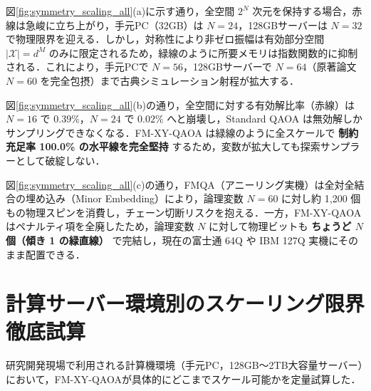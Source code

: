\documentclass[11pt,a4paper]{ltjsarticle}
\begin{document}
\begin{tcolorbox}[keybox, title=機構 1：古典シミュレータのメモリ爆発回避（図(a)参照）]
図\ref{fig:symmetry_scaling_all}(a)に示す通り，全空間 $2^N$ 次元を保持する場合，赤線は急峻に立ち上がり，手元PC（32GB）は $N=24$，128GBサーバーは $N=32$ で物理限界を迎える．しかし，対称性により非ゼロ振幅は有効部分空間 $|\mathcal{X}| = d^M$ のみに限定されるため，緑線のように所要メモリは指数関数的に抑制される．これにより，手元PCで $N=56$，128GBサーバーで $N=64$（原著論文 $N=60$ を完全包摂）まで古典シミュレーション射程が拡大する．
\end{tcolorbox}

\begin{tcolorbox}[keybox, title=機構 2：アルゴリズム的死滅の根本打破（図(b)参照）]
図\ref{fig:symmetry_scaling_all}(b)の通り，全空間に対する有効解比率（赤線）は $N=16$ で $0.39\%$，$N=24$ で $0.02\%$ へと崩壊し，Standard QAOA は無効解しかサンプリングできなくなる．FM-XY-QAOA は緑線のように全スケールで \textbf{制約充足率 100.0\% の水平線を完全堅持} するため，変数が拡大しても探索サンプラーとして破綻しない．
\end{tcolorbox}

\begin{tcolorbox}[keybox, title=機構 3：実機物理ビットの 1対1 対応と浅い回路（図(c)参照）]
図\ref{fig:symmetry_scaling_all}(c)の通り，FMQA（アニーリング実機）は全対全結合の埋め込み（Minor Embedding）により，論理変数 $N=60$ に対し約 1,200 個もの物理スピンを消費し，チェーン切断リスクを抱える．一方，FM-XY-QAOA はペナルティ項を全廃したため，論理変数 $N$ に対して物理ビットも \textbf{ちょうど $N$ 個（傾き 1 の緑直線）} で完結し，現在の富士通 64Q や IBM 127Q 実機にそのまま配置できる．
\end{tcolorbox}

\clearpage

\section{計算サーバー環境別のスケーリング限界徹底試算}
\label{sec:server_limits}

研究開発現場で利用される計算機環境（手元PC，128GB〜2TB大容量サーバー）において，FM-XY-QAOAが具体的にどこまでスケール可能かを定量試算した．
\end{document}
